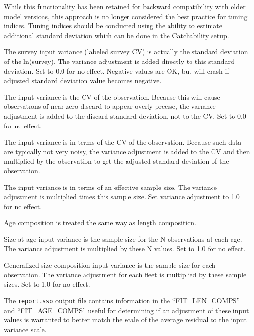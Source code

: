 While this functionality has been retained for backward compatibility with older model versions, this approach is no longer considered the best practice for tuning indices. Tuning indices should be conducted using the ability to estimate additional standard deviation which can be done in the \hyperlink{Qsetup}{Catchability} setup.   

The survey input variance (labeled survey CV) is actually the standard deviation of the ln(survey). The variance adjustment is added directly to this standard deviation. Set to 0.0 for no effect. Negative values are OK, but will crash if adjusted standard deviation value becomes negative.

The input variance is the CV of the observation. Because this will cause observations of near zero discard to appear overly precise, the variance adjustment is added to the discard standard deviation, not to the CV. Set to 0.0 for no effect.

The input variance is in terms of the CV of the observation. Because such data are typically not very noisy, the variance adjustment is added to the CV and then multiplied by the observation to get the adjusted standard deviation of the observation.

The input variance is in terms of an effective sample size. The variance adjustment is multiplied times this sample size. Set variance adjustment to 1.0 for no effect.

Age composition is treated the same way as length composition.
	
Size-at-age input variance is the sample size for the N observations at each age. The variance adjustment is multiplied by these N values. Set to 1.0 for no effect.
	
Generalized size composition input variance is the sample size for each observation. The variance adjustment for each fleet is multiplied by these sample sizes. Set to 1.0 for no effect.
		
The \texttt{report.sso} output file contains information in the ``FIT\_LEN\_COMPS'' and ``FIT\_AGE\_COMPS''  useful for determining if an adjustment of these input values is warranted to better match the scale of the average residual to the input variance scale.
	
